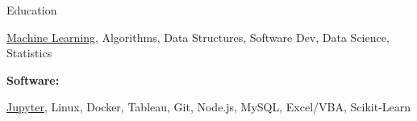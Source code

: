 \documentclass{resume/resume}
\begin{document}
\begin{rSection}{Education}
\begin{adjustwidth}{6em}{0pt}
    \href{https://github.com/Spelkington/mlearning}{Machine Learning},
    Algorithms,
    Data Structures,
    Software Dev,
    Data Science,
    Statistics
    
\end{adjustwidth}


%
%
%
\vspace{-3pt}
{\bf Software:}
\vspace{-1.83em}
\begin{adjustwidth}{6em}{0pt}
    \href{https://github.com/search?q=user\%3ASpelkington+user\%3AUtahTriangle+extension\%3Aipynb&type=Code}{Jupyter},
    Linux,
    Docker,
    Tableau,
    Git,
    Node.js,
    MySQL,
    Excel/VBA,
    Scikit-Learn

\end{adjustwidth}

\end{rSection}
\end{document}

